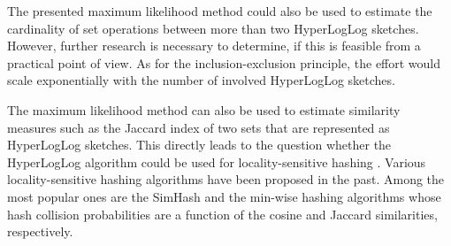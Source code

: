 \documentclass[a4paper]{scrartcl}
\begin{document}
The presented maximum likelihood method could also be used to estimate the cardinality of set operations between more than two HyperLogLog sketches. However, further research is necessary to determine, if this is feasible from a practical point of view. As for the inclusion-exclusion principle, the effort would scale exponentially with the number of involved HyperLogLog sketches.

The maximum likelihood method can also be used to estimate similarity measures such as the Jaccard index of two sets that are represented as HyperLogLog sketches. This directly leads to the question whether the HyperLogLog algorithm could be used for locality-sensitive hashing \cite{Leskovec2014, Wang2014}. Various locality-sensitive hashing algorithms have been proposed in the past. Among the most popular ones are the SimHash \cite{Charikar2002} and the min-wise hashing \cite{Broder1997, Li2011} algorithms whose hash collision probabilities are a function of the cosine and Jaccard similarities, respectively.
\end{document}
